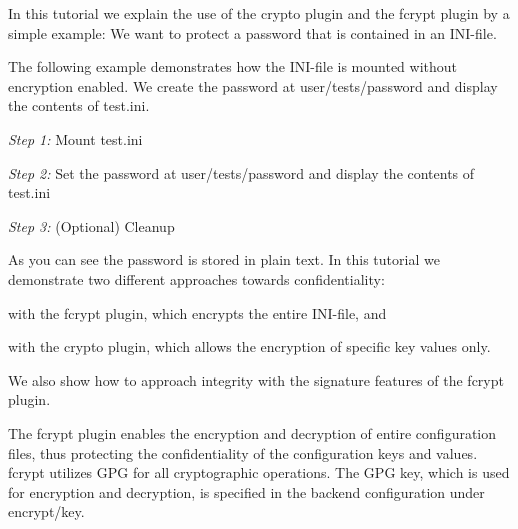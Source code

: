 In this tutorial we explain the use of the {\ttfamily crypto} plugin and the {\ttfamily fcrypt} plugin by a simple example\+: We want to protect a password that is contained in an I\+N\+I-\/file.

The following example demonstrates how the I\+N\+I-\/file is mounted without encryption enabled. We create the password at {\ttfamily user/tests/password} and display the contents of {\ttfamily test.\+ini}.

{\itshape Step 1\+:} Mount {\ttfamily test.\+ini}


\begin{DoxyCode}{0}
\end{DoxyCode}


{\itshape Step 2\+:} Set the password at {\ttfamily user/tests/password} and display the contents of {\ttfamily test.\+ini}


\begin{DoxyCode}{0}
\end{DoxyCode}


{\itshape Step 3\+:} (Optional) Cleanup


\begin{DoxyCode}{0}
\end{DoxyCode}


As you can see the password is stored in plain text. In this tutorial we demonstrate two different approaches towards confidentiality\+:


\begin{DoxyEnumerate}
\item with the {\ttfamily fcrypt} plugin, which encrypts the entire I\+N\+I-\/file, and
\item with the {\ttfamily crypto} plugin, which allows the encryption of specific key values only.
\end{DoxyEnumerate}

We also show how to approach integrity with the signature features of the {\ttfamily fcrypt} plugin.

The {\ttfamily fcrypt} plugin enables the encryption and decryption of entire configuration files, thus protecting the confidentiality of the configuration keys and values. {\ttfamily fcrypt} utilizes G\+PG for all cryptographic operations. The G\+PG key, which is used for encryption and decryption, is specified in the backend configuration under {\ttfamily encrypt/key}.


